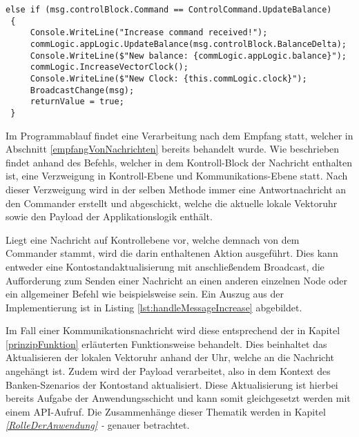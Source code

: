 \begin{lstlisting}[label=lst:handleMessageIncrease,
language=sharpc,
float=ht,
firstnumber=1,
caption=Auszug aus der \code{HandleControlMessage()}-Methode. Hier wird ein UpdateBalance-Befehl verarbeitet.]
 else if (msg.controlBlock.Command == ControlCommand.UpdateBalance)
 {
	 Console.WriteLine("Increase command received!");
	 commLogic.appLogic.UpdateBalance(msg.controlBlock.BalanceDelta);
	 Console.WriteLine($"New balance: {commLogic.appLogic.balance}");
	 commLogic.IncreaseVectorClock();                                    
	 Console.WriteLine($"New Clock: {this.commLogic.clock}");
	 BroadcastChange(msg);
	 returnValue = true;
 }
\end{lstlisting}

Im Programmablauf findet eine Verarbeitung nach dem Empfang statt, welcher in Abschnitt \ref{empfangVonNachrichten} bereits behandelt wurde. Wie beschrieben findet anhand des Befehls, welcher in dem Kontroll-Block der Nachricht enthalten ist, eine Verzweigung in Kontroll-Ebene und Kommunikations-Ebene statt. Nach dieser Verzweigung wird in der selben Methode immer eine Antwortnachricht an den Commander erstellt und abgeschickt, welche die aktuelle lokale Vektoruhr sowie den Payload der Applikationslogik enthält.

Liegt eine Nachricht auf Kontrollebene vor, welche demnach von dem Commander stammt, wird die darin enthaltenen Aktion ausgeführt. Dies kann entweder eine Kontostandaktualisierung mit anschließendem Broadcast, die Aufforderung zum Senden einer Nachricht an einen anderen einzelnen Node oder ein allgemeiner Befehl wie beispielsweise  sein. Ein Auszug aus der Implementierung ist in Listing \ref{lst:handleMessageIncrease} abgebildet.

Im Fall einer Kommunikationsnachricht wird diese entsprechend der in Kapitel \ref{prinzipFunktion} erläuterten Funktionsweise behandelt. Dies beinhaltet das Aktualisieren der lokalen Vektoruhr anhand der Uhr, welche an die Nachricht angehängt ist. Zudem wird der Payload verarbeitet, also in dem Kontext des Banken-Szenarios der Kontostand aktualisiert. Diese Aktualisierung ist hierbei bereits Aufgabe der Anwendungsschicht und kann somit gleichgesetzt werden mit einem API-Aufruf. Die Zusammenhänge dieser Thematik werden in Kapitel \textit{\ref{RolleDerAnwendung} - } genauer betrachtet.


